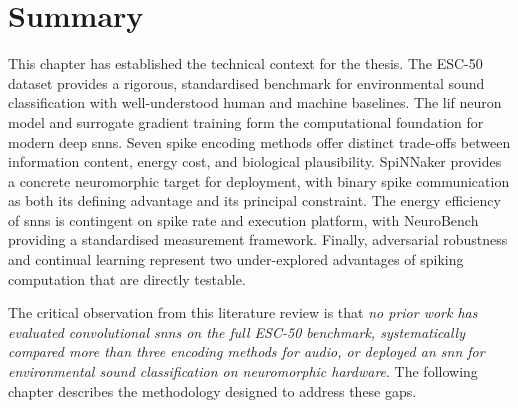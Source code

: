 \section{Summary}
\label{sec:bg-summary}

This chapter has established the technical context for the thesis. The ESC-50 dataset provides a rigorous, standardised benchmark for environmental sound classification with well-understood human and machine baselines. The \gls{lif} neuron model and surrogate gradient training form the computational foundation for modern deep \glspl{snn}. Seven spike encoding methods offer distinct trade-offs between information content, energy cost, and biological plausibility. SpiNNaker provides a concrete neuromorphic target for deployment, with binary spike communication as both its defining advantage and its principal constraint. The energy efficiency of \glspl{snn} is contingent on spike rate and execution platform, with NeuroBench providing a standardised measurement framework. Finally, adversarial robustness and continual learning represent two under-explored advantages of spiking computation that are directly testable.

The critical observation from this literature review is that \emph{no prior work has evaluated convolutional \glspl{snn} on the full ESC-50 benchmark, systematically compared more than three encoding methods for audio, or deployed an \gls{snn} for environmental sound classification on neuromorphic hardware}. The following chapter describes the methodology designed to address these gaps.
